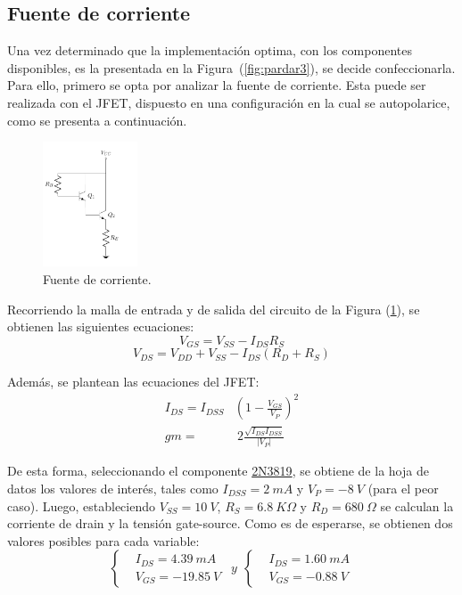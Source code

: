 \subsection{Fuente de corriente}
\label{subsec:fdei}
Una vez determinado que la implementación optima, con los componentes disponibles, es la presentada en la Figura~(\ref{fig:pardar3}), se decide confeccionarla. Para ello, primero se opta por analizar la fuente de corriente. Esta puede ser realizada con el JFET, dispuesto en una configuración en la cual se autopolarice, como se presenta a continuación.
\begin{figure}[H]
\centering
	\includegraphics[width=0.25\textwidth, page=4]{Imagenes/ParDarlington.pdf}
	\caption{Fuente de corriente.}
	\label{fig:fuentei}
\end{figure}

Recorriendo la malla de entrada y de salida del circuito de la Figura (\ref{fig:fuentei}), se obtienen las siguientes ecuaciones:
\begin{equation}
	V_{GS} = V_{SS} - I_{DS} R_{S}
\end{equation}
\begin{equation}
	V_{DS} = V_{DD} + V_{SS} - I_{DS} \left( R_{D} + R_{S} \right)
\end{equation}

Además, se plantean las ecuaciones del JFET:
\begin{equation}
\begin{split}
	I_{DS} = I_{DSS} & \left( 1 - \frac{V_{GS}}{V_P} \right)^2 \\
	gm = & \ 2\frac{\sqrt{I_{DS} I_{DSS}}}{|V_P|}
\end{split}
\end{equation}

De esta forma, seleccionando el componente \href{https://www.onsemi.com/pub/Collateral/2N3819-D.PDF}{2N3819}, se obtiene de la hoja de datos los valores de interés, tales como $I_{DSS} = 2 \ mA$ y $V_P = -8 \ V$ (para el peor caso). Luego, estableciendo $V_{SS} = 10 \ V$, $R_S = 6.8 \ K\Omega$ y $R_D = 680 \ \Omega$ se calculan la corriente de drain y la tensión gate-source. Como es de esperarse, se obtienen dos valores posibles para cada variable:
\begin{equation*}
\left\lbrace
\begin{split}
	&I_{DS} =  4.39 \ mA \\
	&V_{GS} =  -19.85 \ V
\end{split}
\right.
\ \ y \ \
\left\lbrace
\begin{split}
	&I_{DS} =  1.60 \ mA \\
	&V_{GS} =  -0.88 \ V
\end{split}
\right.
\end{equation*}

